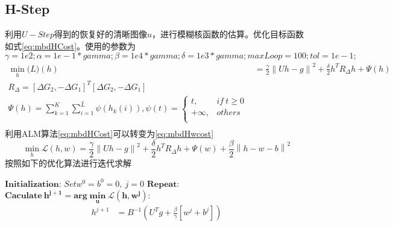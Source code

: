 \documentclass[UTF8]{ctexart}
\begin{document}
\begin{sloppypar}
    \subsection{H-Step}
        利用$U-Step$得到的恢复好的清晰图像$u$，进行模糊核函数的估算。优化目标函数如式\eqref{eq:mbdHCost}。使用的参数为
        $$\gamma = 1e2;\alpha = 1e-1*gamma; \beta = 1e4*gamma; \delta = 1e3*gamma;maxLoop = 100;tol = 1e-1;$$
        \begin{equation}
            \begin{array}{cc}
                \min\limits_h \mathcal(L)(h) &=  \frac{\gamma}{2}\left\| Uh-g \right\|^2 + \frac{\delta}{2}h^TR_\Delta h + \Psi(h)\\
                R_\Delta = \left[  \Delta G_2 , - \Delta G_1\right]^T\left[  \Delta G_2 , - \Delta G_1\right]\\
                \Psi(h)  = \sum\limits_{k=1}^K\sum\limits_{i=1}^{\hat{L}}\psi(h_k(i)),\psi(t)  =\left\{
                \begin{array}{cc}
                    t, & if \ t \geq 0 \\
                    +\infty,&others\\
                \end{array}
                \right.\\
            \end{array}
            \label{eq:mbdHCost}
        \end{equation}
        利用ALM算法\eqref{eq:mbdHCost}可以转变为\eqref{eq:mbdHwcost}
        \begin{equation}
        \min\limits_h \mathcal{L}(h,w) =  \frac{\gamma}{2}\left\| Uh-g \right\|^2 + \frac{\delta}{2}h^TR_\Delta h + \Psi(w) + \frac{\beta}{2}\left\| h - w - b \right\|^2
            \label{eq:mbdHwcost}
        \end{equation}
        按照如下的优化算法进行迭代求解
        \begin{algorithm}
            \caption{$\hat{h}=h-step(h^0)$}
            \begin{algorithmic}
                \STATE $\bm{Initialization}$: $Set w^0=b^0=0,\ j = 0$
                \STATE $\bm{Repeat}$:
                \STATE $\bm{Caculate\ h^{j+1} =arg \min\limits_u \mathcal{L}(h,w^j) }$:
                \begin{equation}
                    \begin{aligned}
                        h^{j+1} &= B^{-1}\left(U^{T}g +  \frac{\beta}{\gamma}\left[ w^j + b^j \right]\right)\\

\end{aligned}
\end{equation}
\end{algorithmic}
\end{algorithm}
\end{sloppypar}
\end{document}
